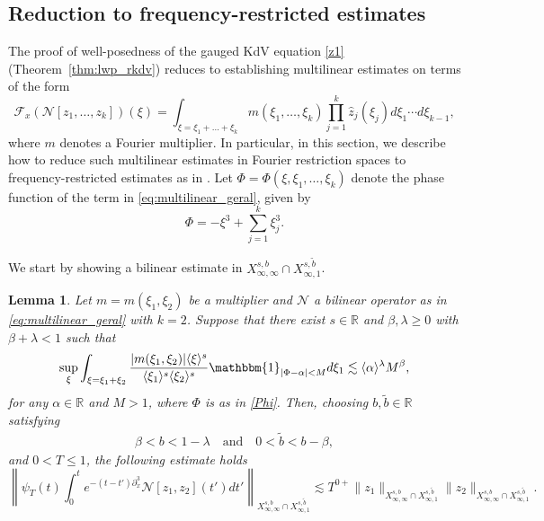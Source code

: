 \documentclass[a4paper,
11pt,  reqno]{amsart}
\newcommand{\jap}[1]{\langle #1 \rangle}
\newcommand{\5}{\textup{V}}
\newcommand{\noi}{\noindent}
\newcommand{\ft}{\widehat}
\newcommand{\les}{\lesssim}
\newcommand{\wt}{\widetilde}
\newtheorem{lemma}[theorem]{Lemma}
\theoremstyle{remark}
\newcommand{\R}{\mathbb{R}}
\newcommand{\Ft}{{\mathcal{F}}}
\numberwithin{equation}{section}
\numberwithin{theorem}{section}
\newcommand{\Ncal}{\mathcal{N}}
\begin{document}
		
		
	
	
	
	\subsection{Reduction to frequency-restricted estimates}\label{sec:fre}
	
	

	The proof of well-posedness of the gauged KdV equation \eqref{z1} (Theorem~\ref{thm:lwp_rkdv}) reduces to establishing multilinear estimates on terms of the form
		\begin{equation}\label{eq:multilinear_geral}
			\Ft_x (\mathcal{N}[z_1,\dots, z_k])(\xi)=\int_{\xi=\xi_1+\dots+\xi_k} m(\xi_1,\dots,\xi_k)\prod_{j=1}^k\ft{z}_j(\xi_j) d\xi_1\cdots d\xi_{k-1}, 
		\end{equation}
where $m$ denotes a Fourier multiplier. 
In particular, in this section, we describe how to reduce such multilinear estimates in Fourier restriction spaces to frequency-restricted estimates as in \cite{CLS}. Let  $\Phi = \Phi(\xi, \xi_1, \ldots, \xi_k)$ denote the phase function of the term in \eqref{eq:multilinear_geral}, given by
\begin{equation}\label{Phi}
 \Phi=-\xi^3+\sum_{j=1}^k\xi_j^3.
\end{equation}
        


\noi
We start by showing a bilinear estimate in $X^{s,b}_{\infty, \infty} \cap X^{s, \wt b}_{\infty, 1}$. 

		
		\begin{lemma}\label{lem:reduction_fre_k2}
			Let $m= m(\xi_1,\xi_2)$ be a multiplier and $\Ncal$ a bilinear operator as in \eqref{eq:multilinear_geral} with $k=2$. 
Suppose that there exist $s\in\R$ and $\beta,\lambda\ge 0$ with $\beta+\lambda<1$ such that
			\begin{equation}\label{fre}
				\sup_{\xi} \int_{\xi=\xi_1+\xi_2}\frac{|m(\xi_1,\xi_2)|\jap{\xi}^s}{\jap{\xi_1}^s\jap{\xi_2}^s} \mathbbm{1}_{|\Phi-\alpha|<M} d\xi_1 \lesssim \jap{\alpha}^\lambda M^\beta, 
			\end{equation}
for any $\alpha\in \R$ and $M>1$,
where $\Phi$ is as in \eqref{Phi}.
Then, choosing $b,\wt b\in\R$ satisfying 
\begin{align}\label{freb}
 \beta<b<1-\lambda
\quad 
\text{and}
\quad 
 0<\wt{b}<b-\beta, 
\end{align}
and $ 0 < T \le 1$, the following estimate holds
\begin{equation}\label{eq:bilin_infty}
    \left\|\psi_T (t)\int_0^t e^{-(t-t')\partial_x^3}\Ncal[z_1,z_2](t')dt' \right\|_{X^{s,b}_{\infty, \infty} \cap X^{s,\tilde{b}}_{\infty,1}}  \les T^{0+}\|z_1\|_{X^{s,b}_{\infty, \infty} \cap X^{s,\tilde{b}}_{\infty,1}}\|z_2\|_{X^{s,b}_{\infty, \infty} \cap X^{s,\tilde{b}}_{\infty,1}}.
\end{equation}

            

		\end{lemma}
\end{document}
